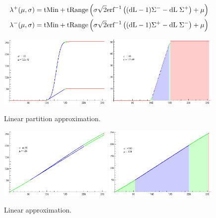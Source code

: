 \begin{equation}\label{eq:LowHighGen}
\begin{aligned}
\lambda^+(\mu,\sigma)  &=  \text{tMin} + \text{tRange} \left( \sigma \sqrt{2}  \text{erf}^{-1}\left((\text{dL}-1) \Sigma^- -\text{dL} \; \Sigma^+ \right)+\mu \right) \\
\lambda^-(\mu,\sigma)  &=  \text{tMin} + \text{tRange} \left( \sigma \sqrt{2} \text{erf}^{-1}\left((\text{dL}-1) \Sigma^+-\text{dL} \; \Sigma^-\right)+\mu \right)
\end{aligned}
\end{equation}



\begin{figure}[h!]
  \centering
    \includegraphics[width=0.49\textwidth]{Chapter2/Figs/partitionSmooth2.eps}
    \includegraphics[width=0.49\textwidth]{Chapter2/Figs/partitionColor2.eps}
    \caption{Linear partition approximation.}  \label{fig:Partition}
\end{figure}

\begin{figure}[h!]
  \centering
    \includegraphics[width=0.49\textwidth]{Chapter2/Figs/linearSmooth2.eps}
    \includegraphics[width=0.49\textwidth]{Chapter2/Figs/linearColor2.eps}
    \caption{Linear approximation.}  \label{fig:Linear}
\end{figure}

